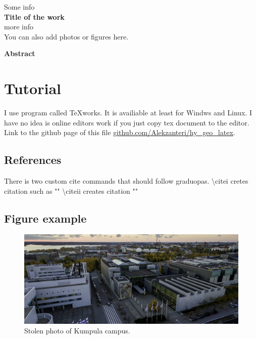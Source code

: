 \documentclass[12pt]{article}%
\begin{document}
\begin{titlepage}
\begin{center}
\vspace*{8cm}
Some info\\
\Large{\textbf{Title of the work}}\\
more info\\
\vspace*{4cm}
\tiny{You can also add photos or figures here.}
\end{center}
\end{titlepage}

{\textbf{Abstract}}\\
\lipsum[1]
\newpage

\tableofcontents
\newpage

\fancyhead[C]{\thepage}
\setcounter{page}{3}

\section{Tutorial}
I use program called TeXworks. It is availiable at least for Windws and Linux. I have no idea is online editors work if you just copy tex document to the editor.\\

Link to the github page of this file \href{https://github.com/Alekzanteri/hy_geo_latex}{github.com/Alekzanteri/hy\_geo\_latex}.

\subsection{References}
There is two custom cite commands that should follow graduopas. \textbackslash citei cretes citation such as "" \textbackslash citeii creates citation "" 

\subsection{Figure example}
\begin{figure}[h]
\includegraphics[width=\linewidth]{kumpula_ilmakuva.jpg}
\caption{Stolen photo of Kumpula campus.}
\end{figure}
\end{document}
